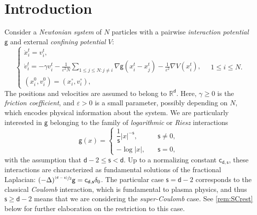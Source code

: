 \documentclass[JEP,XML,SOM,Unicode,published]{cedram}
\newcommand{\psfrac}[2]{\sfrac{(#1)}{#2}}
\theoremstyle{plain}
\theoremstyle{definition}
\newcommand{\R}{{\mathbb{R}}}
\let\ga\gamma
\let\vep\varepsilon
\renewcommand{\d}{\mathsf{d}}
\newcommand{\g}{{\mathsf{g}}}
\newcommand{\s}{\mathsf{s}}
\newcommand{\cd}{\mathsf{c}_{\mathsf{d},\mathsf{s}}}
\begin{document}
\section{Introduction}\label{sec:intro}
Consider a \emph{Newtonian system} of $N$ particles with a pairwise \emph{interaction potential} $\g$ and external \emph{confining potential} $V$:
\begin{equation}\label{eq:NewODE}
\begin{cases}
\dot{x}_i^t = v_i^t, \\
\dot{v}_i^t = -\ga v_i^t \displaystyle-\frac{1}{\vep^2 N} \sum_{1\leq j\leq N: j\neq i}\nabla\g(x_i^t-x_j^t) -\frac{1}{\vep^2}\nabla V(x_i^t),\\
(x_i^0,v_i^0) = (x_i^\circ,v_i^\circ),
\end{cases}
\quad 1\le i\le N.
\end{equation}
The positions and velocities are assumed to belong to $\R^\d$. Here, $\ga\geq 0$ is the \emph{friction coefficient}, and $\vep>0$ is a small parameter, possibly depending on $N$, which encodes physical information about the system. We are particularly interested in $\g$ belonging to the family of \emph{logarithmic} or \emph{Riesz} interactions
\begin{equation}\label{eq:gmod}
\g(x)= \begin{cases} \dfrac{1}{\s} |x|^{-\s}, \quad & \s \neq 0,\\
-\log |x|, \quad & \s=0,
\end{cases}
\end{equation}
with the assumption that $\d-2\le \s<\d$. Up to a normalizing constant $\cd$, these interactions are characterized as fundamental solutions of the fractional Laplacian: $(-\Delta)^{\psfrac{\d-\s}{2}}\g = \cd \delta_0$. The particular case $\s=\d-2$ corresponds to the classical \emph{Coulomb} interaction, which is fundamental to plasma physics, and thus $\s \ge \d-2$ means that we are considering the \emph{super-Coulomb} case. See \cref{rem:SCrest} below for further elaboration on the restriction to this case.
\end{document}
